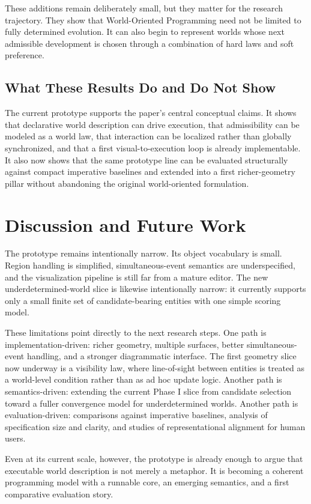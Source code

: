 These additions remain deliberately small, but they matter for the research trajectory.
They show that World-Oriented Programming need not be limited to fully determined evolution.
It can also begin to represent worlds whose next admissible development is chosen through a combination of hard laws and soft preference.

\subsection{What These Results Do and Do Not Show}

The current prototype supports the paper's central conceptual claims.
It shows that declarative world description can drive execution, that admissibility can be modeled as a world law, that interaction can be localized rather than globally synchronized, and that a first visual-to-execution loop is already implementable.
It also now shows that the same prototype line can be evaluated structurally against compact imperative baselines and extended into a first richer-geometry pillar without abandoning the original world-oriented formulation.

\section{Discussion and Future Work}

The prototype remains intentionally narrow.
Its object vocabulary is small.
Region handling is simplified, simultaneous-event semantics are underspecified, and the visualization pipeline is still far from a mature editor.
The new underdetermined-world slice is likewise intentionally narrow: it currently supports only a small finite set of candidate-bearing entities with one simple scoring model.

These limitations point directly to the next research steps.
One path is implementation-driven: richer geometry, multiple surfaces, better simultaneous-event handling, and a stronger diagrammatic interface.
The first geometry slice now underway is a visibility law, where line-of-sight between entities is treated as a world-level condition rather than as ad hoc update logic.
Another path is semantics-driven: extending the current Phase I slice from candidate selection toward a fuller convergence model for underdetermined worlds.
Another path is evaluation-driven: comparisons against imperative baselines, analysis of specification size and clarity, and studies of representational alignment for human users.

Even at its current scale, however, the prototype is already enough to argue that executable world description is not merely a metaphor.
It is becoming a coherent programming model with a runnable core, an emerging semantics, and a first comparative evaluation story.
